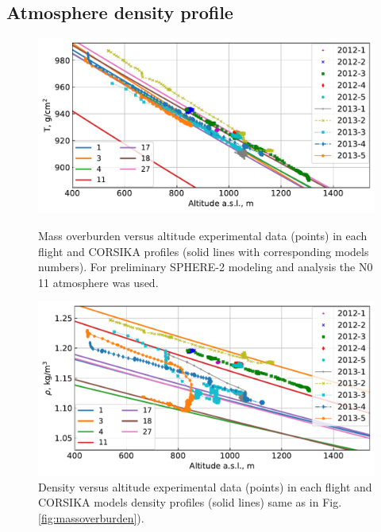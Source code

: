 \documentclass[final,5p,times,twocolumn]{elsarticle}
\begin{document}
\subsection{Atmosphere density profile}
\label{sect:atmosphere-profile}
\begin{figure}[bt]
\centering
\begin{minipage}[t]{0.48\textwidth}
    \includegraphics[width=\textwidth]{figs/atmosphere_T.pdf}
    \vspace{-1.0pc}
    \caption{Mass overburden versus altitude experimental data (points) in each flight and CORSIKA profiles (solid lines with corresponding models numbers). For preliminary SPHERE-2 modeling and analysis the N0 11 atmosphere was used.}
\label{fig:massoverburden}
\end{minipage}
\vfill
\vspace{1pc}
\begin{minipage}[t]{0.48\textwidth}
    \includegraphics[width=\textwidth]{figs/atmosphere_rho.pdf}
    \vspace{-1.0pc}
    \caption{Density versus altitude experimental data (points) in each flight and CORSIKA models density profiles (solid lines) same as in Fig. \ref{fig:massoverburden}).}
\label{fig:density}
\end{minipage}
\end{figure}
\end{document}
